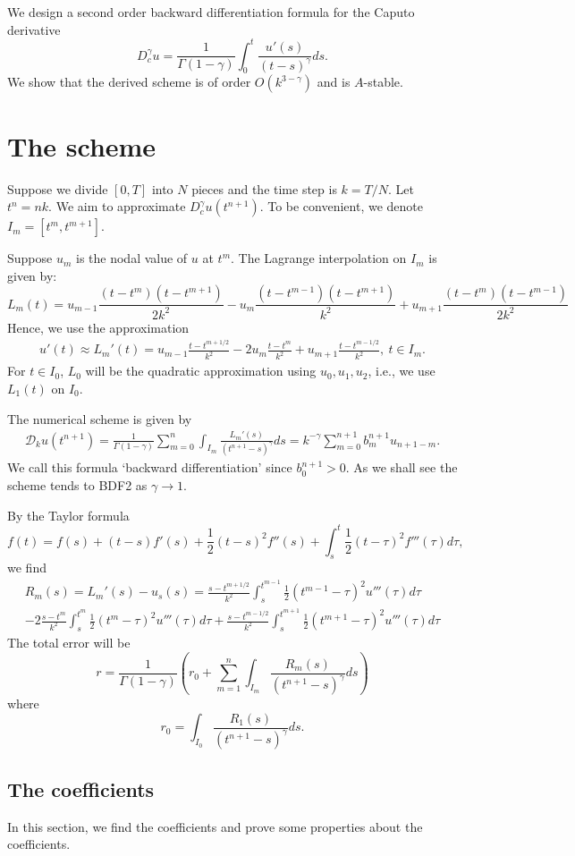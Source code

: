 \documentclass[11pt]{article}
\begin{document}
We design a second order backward differentiation formula for the Caputo derivative $$
D_c^{\gamma}u=\frac{1}{\Gamma(1-\gamma)}\int_0^t\frac{u'(s)}{(t-s)^{\gamma}}ds.
$$
We show that the derived scheme is of order $O(k^{3-\gamma})$
and is $A$-stable. 

\section{The scheme}
Suppose we divide $[0, T]$ into $N$ pieces and the time step is $k=T/N$. Let $t^n=nk$. We aim to approximate $D_c^{\gamma}u(t^{n+1})$. To be convenient, we denote $I_m=[t^m, t^{m+1}]$.

Suppose $u_m$ is the nodal value of $u$ at $t^m$. The Lagrange interpolation on $I_m$ is given by:
$$
L_m(t)=u_{m-1}\frac{(t-t^m)(t-t^{m+1})}{2k^2}-u_m\frac{(t-t^{m-1})(t-t^{m+1})}{k^2}+u_{m+1}\frac{(t-t^m)(t-t^{m-1})}{2k^2}
$$
Hence, we use the approximation 
\begin{gather}
u'(t)\approx L_m'(t)=u_{m-1}\frac{t-t^{m+1/2}}{k^2}-2u_m\frac{t-t^m}{k^2}+u_{m+1}\frac{t-t^{m-1/2}}{k^2},\ t\in I_m.
\end{gather}
For $t\in I_0$, $L_0$ will be the quadratic approximation using $u_0, u_1, u_2$, i.e., we use $L_1(t)$ on $I_0$.

The numerical scheme is given by
\begin{gather}
\mathcal{D}_ku(t^{n+1})=\frac{1}{\Gamma(1-\gamma)}\sum_{m=0}^n
\int_{I_m}\frac{L_m'(s)}{(t^{n+1}-s)^{\gamma}}ds=k^{-\gamma}\sum_{m=0}^{n+1}b^{n+1}_m u_{n+1-m}.
\end{gather}
We call this formula `backward differentiation' since $b_0^{n+1}>0$. As we shall see the scheme tends to BDF2 as $\gamma\to 1$.


By the Taylor formula $$
f(t)=f(s)+(t-s)f'(s)+\frac{1}{2}(t-s)^2f''(s)+\int_s^t\frac{1}{2}(t-\tau)^2 f'''(\tau)d\tau,
$$
we find 
\begin{multline}
R_m(s)=L_m'(s)-u_s(s)=\frac{s-t^{m+1/2}}{k^2}\int_s^{t^{m-1}}\frac{1}{2}(t^{m-1}-\tau)^2 u'''(\tau)d\tau\\
-2\frac{s-t^m}{k^2}\int_s^{t^m}\frac{1}{2}(t^m-\tau)^2 u'''(\tau)d\tau
+\frac{s-t^{m-1/2}}{k^2}\int_s^{t^{m+1}}\frac{1}{2}(t^{m+1}-\tau)^2 u'''(\tau)d\tau
\end{multline}
The total error will be $$
r=\frac{1}{\Gamma(1-\gamma)}\left(r_0+\sum_{m=1}^n\int_{I_m}\frac{R_m(s)}{(t^{n+1}-s)^{\gamma}}ds\right)
$$
where $$
r_0=\int_{I_0}\frac{R_1(s)}{(t^{n+1}-s)^{\gamma}}ds.
$$

\subsection{The coefficients}
In this section, we find the coefficients and prove some properties about the coefficients.
\end{document}
